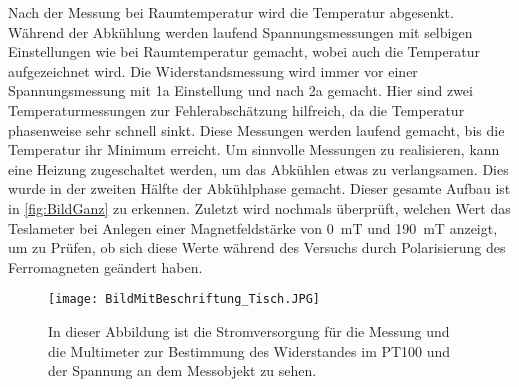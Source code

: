 Nach der Messung bei Raumtemperatur wird die Temperatur abgesenkt. Während der Abkühlung werden laufend Spannungsmessungen mit selbigen Einstellungen wie bei Raumtemperatur gemacht, wobei auch die Temperatur aufgezeichnet wird.
Die Widerstandsmessung wird immer vor einer Spannungsmessung mit 1a Einstellung und nach 2a gemacht.
Hier sind zwei Temperaturmessungen zur Fehlerabschätzung hilfreich, da die Temperatur phasenweise sehr schnell sinkt.
Diese Messungen werden laufend gemacht, bis die Temperatur ihr Minimum erreicht.
Um sinnvolle Messungen zu realisieren, kann eine Heizung zugeschaltet werden, um das Abkühlen etwas zu verlangsamen.
Dies wurde in der zweiten Hälfte der Abkühlphase gemacht. Dieser gesamte Aufbau ist in \autoref{fig:BildGanz} zu erkennen.
Zuletzt wird nochmals überprüft, welchen Wert das Teslameter bei Anlegen einer Magnetfeldstärke von \SI{0}{mT} und \SI{190}{mT} anzeigt, um zu Prüfen, ob sich diese Werte während des Versuchs durch Polarisierung des Ferromagneten geändert haben.

\begin{figure}[H]
    \centering
    \texttt{[image: BildMitBeschriftung\_Tisch.JPG]}
    \caption{In dieser Abbildung ist die Stromversorgung für die Messung und die Multimeter zur Bestimmung des Widerstandes im PT100 und der Spannung an dem Messobjekt zu sehen.}
    \label{fig:BildGanz}
\end{figure}
